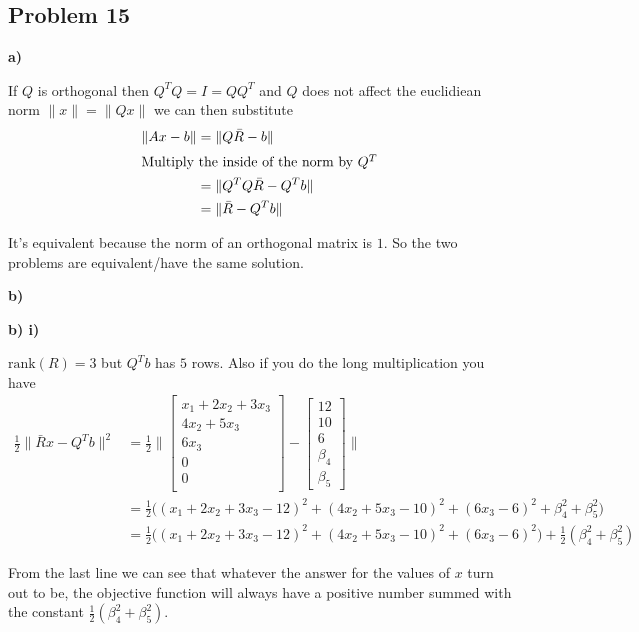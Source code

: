 \subsection{Problem 15}

\textbf{a)}

\answer

If $Q$ is orthogonal then $Q^TQ = I = QQ^T$ and $Q$ does not affect the euclidiean norm $\|x\| = \|Qx\|$ we can then substitute
\begin{align*}
	\| Ax - b \| &= \| Q\bar{R} -b \| \\
\intertext{Multiply the inside of the norm by $Q^T$}
	&= \|Q^TQ\bar{R} - Q^Tb\| \\
	&= \|\bar{R} - Q^Tb\|
\end{align*}

It's equivalent because the norm of an orthogonal matrix is $1$. So the two problems are equivalent/have the same solution.

\textbf{b)}

\textbf{b) i)}

\answer

$\text{rank}(R) = 3$ but $Q^Tb$ has $5$ rows. Also if you do the long multiplication you have
\begin{align*}
\frac{1}{2} \| \bar{R}x - Q^Tb\|^2 &=  \frac{1}{2}\|
\begin{bmatrix}
	x_1 + 2x_2 + 3x_3\\
	4x_2 + 5x_3\\
	6x_3 \\
	0 \\
	0 \\
\end{bmatrix}
-
\begin{bmatrix}
12 \\ 10 \\ 6 \\ \beta_4 \\ \beta_5
\end{bmatrix} \|\\
&= \frac{1}{2} \Bigg( (x_1 + 2x_2 + 3x_3 - 12)^2 + (4x_2 + 5x_3 -10)^2 + (6x_3 - 6)^2 + \beta_4^2 + \beta_5^2  \Bigg) \\
&=\frac{1}{2} \Bigg( (x_1 + 2x_2 + 3x_3 - 12)^2 + (4x_2 + 5x_3 -10)^2 + (6x_3 - 6)^2  \Bigg) + \frac{1}{2}( \beta_4^2 + \beta_5^2)
\end{align*}

From the last line we can see that whatever the answer for the values of $x$ turn out to be, the objective function will always have a positive number summed with the constant $\frac{1}{2}( \beta_4^2 + \beta_5^2)$.

